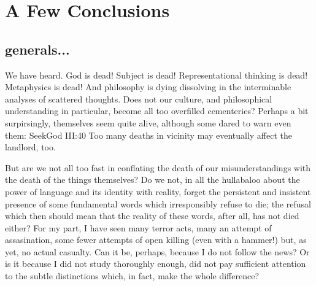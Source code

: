
\section{A Few Conclusions}

\subsection{generals...}

\pa We have heard.
God is dead!  Subject is dead!  Representational thinking is dead! 
Metaphysics is dead!  And philosophy is dying dissolving in the interminable
analyses of scattered thoughts.  Does not our culture,
and philosophical understanding in particular, become all too
overfilled cementeries?
Perhaps a bit surpirsingly,  themselves seem
quite alive, although some dared to warn even them:
\citet{the end of the philosophers who did not honor God was
nothing other than to perish in their vanities.}{SeekGod}{ III:40} Too many
deaths in vicinity may eventually affect the landlord, too.


But are we not all too fast in conflating the death of our
misunderstandings with the death of the things themselves?  Do we not,
in all the hullabaloo about the power of language and its identity with reality, forget
the persistent and insistent presence of some fundamental words which
irresponsibly refuse to die; the refusal which then should mean that
the reality of these words, after all, has not died either?  For my
part, I have seen many terror acts, many an attempt of assasination,
some fewer attempts of open killing (even with a hammer!) but, as yet,
no actual casualty.  Can it be, perhaps, because I do not follow the
news?  Or is it because I did not study thoroughly enough, did not pay
sufficient attention to the subtle distinctions which, in fact, make
the whole difference? 

